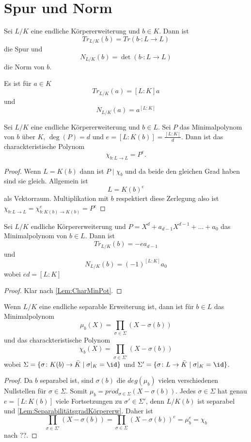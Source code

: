 \section{Spur und Norm}
\begin{Def}
	Sei \(L/K\) eine endliche Körpererweiterung und \(b\in K\).
	Dann ist \[Tr_{L/K}(b)=Tr(b\cdot \colon L\to L)\] die Spur und
	\[N_{L/K}(b)=\det(b\cdot\colon L\to L)\] die Norm von \(b\).
\end{Def}
\begin{Bem}
	Es ist für \(a\in K\)
	\[Tr_{L/K}(a)=[L:K]a\] und
	\[N_{L/K}(a)=a^{[L:K]}\]
\end{Bem}
\begin{Lemma}\label{Lem:CharMinPot}
	Sei \(L/K\) eine endliche Körpererweiterung und \(b\in L\). Sei \(P\) das Minimalpolynom von \(b\) über \(K\),
	\(\deg(P)=d\) und \(e=[L:K(b)]=\frac{[L:K]}{d}\). Dann ist das charackteristische Polynom \[\chi_{b\colon L\to L}=P^e.\]
\end{Lemma}
\begin{proof}
	Wenn \(L=K(b)\) dann ist \(P\mid \chi_b\) und da beide den gleichen Grad haben sind sie gleich.
	Allgemein ist \[L=K(b)^e\] als Vektorraum. Multiplikation mit \(b\) respektiert diese Zerlegung also ist
	\(\chi_{b\colon L\to L}=\chi_{b\colon K(b)\to K(b)}^e=P^e\)
\end{proof}
\begin{Kor}
	Sei \(L/K\) endliche Körpererweiterung und \(P=X^d+a_{d-1}X^{d-1}+\dots+a_0\) das Minimalpolynom von \(b\in L\). Dann ist 
	\[Tr_{L/K}(b)=-ea_{d-1}\] und
	\[N_{L/K}(b)=(-1)^{[L:K]}a_0\] wobei \(ed=[L:K]\)
\end{Kor}
\begin{proof} Klar nach \cref{Lem:CharMinPot}.
\end{proof}
\begin{Satz}\label{Satz:MipolCharSep} Wenn \(L/K\) eine endliche separable Erweiterung ist, dann ist für \(b\in L\) das Minimalpolynom
	\[\mu_b(X)=\prod_{\sigma\in\Sigma}(X-\sigma(b))\] und das charackteristische Polynom
	\[\chi_b(X)=\prod_{\sigma\in\Sigma'}(X-\sigma(b))\]
	wobei \(\Sigma=\{\sigma\colon K(b)\to \bar K\mid \sigma|_K=\id\}\) und \(\Sigma'=\{\sigma\colon L\to \bar K\mid \sigma|_K=\id\}\).
	\end{Satz}
\begin{proof}
	Da \(b\) separabel ist, sind \(\sigma(b)\) die \(deg(\mu_b)\) vielen verschiedenen Nullstellen für \(\sigma\in\Sigma\). Somit \(\mu_b=prod_{\sigma\in\Sigma}(X-\sigma(b))\).
	Jedes \(\sigma\in\Sigma\) hat genau \(e=[L:K(b)]\) viele
	Fortsetzungen zu \(\sigma'\in \Sigma'\), denn \(L/K(b)\) ist separabel und \ref{Lem:SeparabilitätsgradKörpererw}.
	Daher ist 
	\[\prod_{\sigma\in\Sigma'}(X-\sigma(b))=\prod_{\sigma\in\Sigma}(X-\sigma(b))^e=\mu_b^e=\chi_b\] nach ??.
\end{proof}
